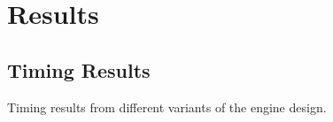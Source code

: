 \chapter{Results}

\section{Timing Results}

Timing results from different variants of the engine design.
